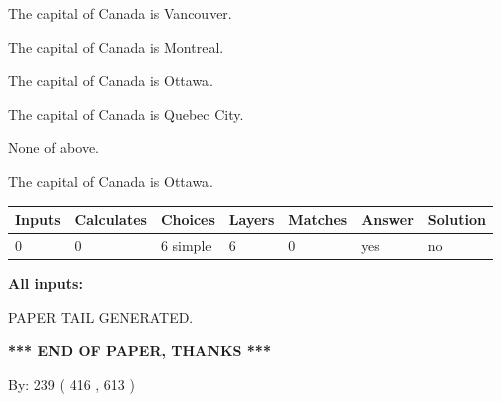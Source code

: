 \documentclass[12pt]{article}
\begin{document}
 
The capital of Canada is Vancouver.
 
 
The capital of Canada is Montreal.
 
 
The capital of Canada is Ottawa.
 
 
The capital of Canada is Quebec City.
 
 
 None of above.
 
 
\noindent{}
 
 
The capital of Canada is Ottawa.
 
 
\noindent{}
 
 
   
   
   
   
\noindent\begin{tabular}{|l|l|l|l|l|l|l|}
 \hline
Inputs & Calculates & Choices & Layers & Matches & Answer & Solution \\ \hline
 0  & 
 0  & 
 6
  simple  
  & 
 6  & 
 0  & 
  yes & 
  no 
  \\ \hline
 \end{tabular}
   
   
   
   
\noindent{}
   
   
   
   
\noindent\vspace{0.1in}\hspace{-0.08in} {\textbf{\Large{All inputs: }}}
   
   
   
   
   
   
 \vspace{0.2in}
 
   
   
\vspace{2.0in} PAPER TAIL GENERATED.
   
   
   
   
\vspace{1.0in} 
{\textbf{\large{ *** END OF PAPER, THANKS *** }}} 
   
   
\hspace{1.0in} By: 
 239 ( 416 ,  613 )
   
\end{document}
